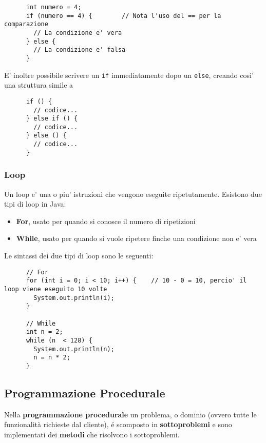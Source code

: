 \documentclass{article}
\begin{document}
{    \begin{verbatim}
      int numero = 4;
      if (numero == 4) {        // Nota l'uso del == per la comparazione
        // La condizione e' vera
      } else {
        // La condizione e' falsa
      }
    \end{verbatim}

    E' inoltre possibile scrivere un \texttt{if} immediatamente dopo un \texttt{else}, creando cosi' una struttura simile a

    \begin{verbatim}
      if () {
        // codice...
      } else if () {
        // codice...
      } else () {
        // codice...
      }
    \end{verbatim}

    \subsubsection{Loop} %
    Un loop e' una o piu' istruzioni che vengono eseguite ripetutamente. Esistono due tipi di loop in Java:
    
    \begin{itemize}
      \item \textbf{For}, usato per quando si conosce il numero di ripetizioni
      \item \textbf{While}, usato per quando si vuole ripetere finche una condizione non e' vera
    \end{itemize}

    Le sintassi dei due tipi di loop sono le seguenti:

    \begin{verbatim}
      // For
      for (int i = 0; i < 10; i++) {    // 10 - 0 = 10, percio' il loop viene eseguito 10 volte
        System.out.println(i);
      }

      // While
      int n = 2;
      while (n  < 128) {
        System.out.println(n);
        n = n * 2;
      }
    \end{verbatim}

    \subsection{Programmazione Procedurale}
    Nella \textbf{programmazione procedurale} un problema, o dominio \small{(ovvero tutte le funzionalità richieste dal cliente)}, é scomposto in \textbf{sottoproblemi} e sono implementati dei \textbf{metodi} che risolvono i sottoproblemi.

}
\end{document}
